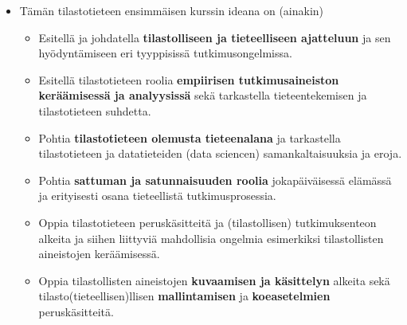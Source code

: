 \documentclass[
]{book}
\providecommand{\tightlist}{%
  \setlength{\itemsep}{0pt}\setlength{\parskip}{0pt}}
\begin{document}
\begin{itemize}
\tightlist
\item
  Tämän tilastotieteen ensimmäisen kurssin ideana on (ainakin)

  \begin{itemize}
  \tightlist
  \item
    Esitellä ja johdatella \textbf{tilastolliseen ja tieteelliseen ajatteluun} ja sen hyödyntämiseen eri tyyppisissä tutkimusongelmissa.
  \item
    Esitellä tilastotieteen roolia \textbf{empiirisen tutkimusaineiston keräämisessä ja analyysissä} sekä tarkastella tieteentekemisen ja tilastotieteen suhdetta.
  \item
    Pohtia \textbf{tilastotieteen olemusta tieteenalana} ja tarkastella tilastotieteen ja datatieteiden (data sciencen) samankaltaisuuksia ja eroja.
  \item
    Pohtia \textbf{sattuman ja satunnaisuuden roolia} jokapäiväisessä elämässä ja erityisesti osana tieteellistä tutkimusprosessia.
  \item
    Oppia tilastotieteen peruskäsitteitä ja (tilastollisen) tutkimuksenteon alkeita ja siihen liittyviä mahdollisia ongelmia esimerkiksi tilastollisten aineistojen keräämisessä.
  \item
    Oppia tilastollisten aineistojen \textbf{kuvaamisen ja käsittelyn} alkeita sekä tilasto(tieteellisen)llisen \textbf{mallintamisen} ja \textbf{koeasetelmien} peruskäsitteitä.
  \end{itemize}
\end{itemize}

\vspace{0.75cm}
\end{document}
